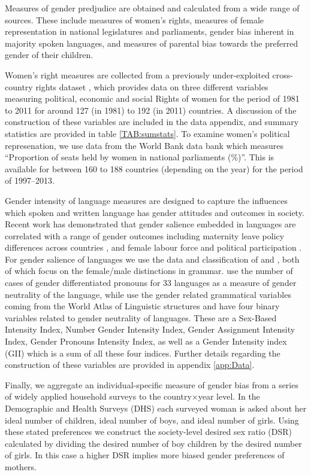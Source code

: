 \documentclass[11pt]{article}
\begin{document}
\begin{spacing}{1.4}
Measures of gender predjudice are obtained and calculated from a wide range of
sources.  These include measures of women's rights, measures of female 
representation in national legislatures and parliaments, gender bias inherent
in majority spoken languages, and measures of parental bias towards the 
preferred gender of their children.

Women's right measures are collected from a previously under-exploited cross-%
country rights dataset \citep{CingranelliData2013}, which provides data on three 
different variables measuring political, economic and social Rights of women for 
the period of 1981 to 2011 for around 127 (in 1981) to 192 (in 2011) countries.
A discussion of the construction of these variables are included in the data
appendix, and summary statistics are provided in table \ref{TAB:sumstats}.  To
examine women's political represenation, we use data from the World Bank data bank
which measures ``Proportion of seats held by women in national parliaments (\%)''.
This is available for between 160 to 188 countries (depending on the year) for 
the period of 1997--2013.

Gender intensity of language measures are designed to capture the influences which
spoken and written language has gender attitudes and outcomes in society.  Recent
work has demonstrated that gender salience embedded in languages are correlated 
with a range of gender outcomes including maternity leave policy differences across 
countries \citep{givati2012law}, and female labour force and political 
participation \citep{gay2013}. For gender salience of languages we use the data and 
classification of \cite{gay2013} and \citet{givati2012law}, both of which focus on
the female/male distinctions in grammar.  \citet{givati2012law} use the number of 
cases of gender differentiated pronouns for 33 languages as a measure of gender 
neutrality of the language, while \cite{gay2013} use the gender related grammatical 
variables coming from the World Atlas of Linguistic structures and have four binary 
variables related to gender neutrality of languages.  These are a Sex-Based Intensity 
Index, Number Gender Intensity Index, Gender Assignment Intensity Index, Gender 
Pronouns Intensity Index, as well as a Gender Intensity index (GII) which is a sum of 
all these four indices.  Further details regarding the construction of these variables 
are provided in appendix \ref{app:Data}.

Finally, we aggregate an individual-specific measure of gender bias from a 
series of widely applied household surveys to the country$\times$year level. In 
the Demographic and Health Surveys (DHS) each surveyed woman is asked about her 
ideal number of children, ideal number of boys, and ideal number of girls. Using 
these stated preferences we construct the society-level desired sex ratio (DSR) 
calculated by dividing the desired number of boy children by the desired number 
of girls.  In this case a higher DSR implies more biased gender preferences of 
mothers.


\end{spacing}
\end{document}
